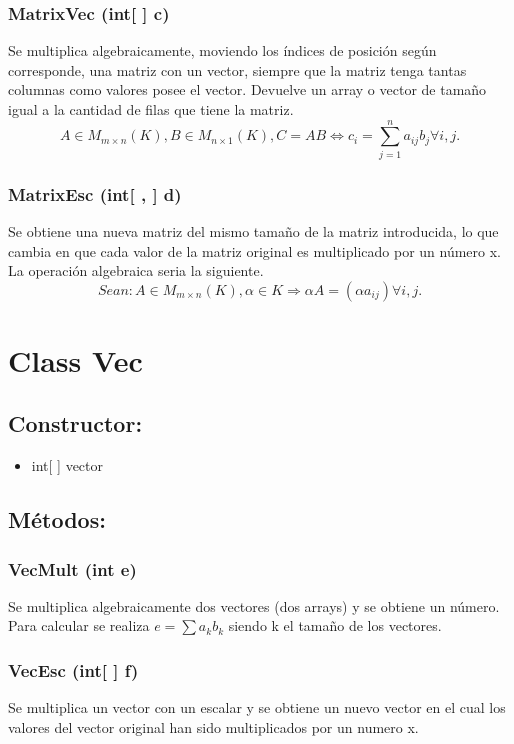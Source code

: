 \documentclass[a4paper,12pt,]{article}
\begin{document}
\subsubsection*{MatrixVec (int[ ] c)}
Se multiplica algebraicamente, moviendo los índices de posición según corresponde, una matriz con un vector, siempre 
que la matriz tenga tantas columnas como valores posee el vector. Devuelve un array o vector de tamaño igual a la 
cantidad de filas que tiene la matriz.
\[ A \in M_{m\times n}(K), B \in M_{n \times 1}(K), C = AB \Leftrightarrow c_i = \sum_{j = 1}^{n} a_{ij}b_j \forall i,j. \]

\subsubsection*{MatrixEsc (int[ , ] d)}
Se obtiene una nueva matriz del mismo tamaño de la matriz introducida, lo que cambia en que cada valor de la matriz 
original es multiplicado por un número x. La operación algebraica seria la siguiente.
\[ Sean:  A \in M_{m\times n}(K), \alpha \in K  \Rightarrow  \alpha A = ( \alpha a_{ij} ) \forall i,j. \]


\section*{Class Vec}

\subsection*{Constructor:}
\begin{itemize}
    \item int[ ] vector
\end{itemize}

\subsection*{Métodos:}
\subsubsection*{VecMult (int e)}
Se multiplica algebraicamente dos vectores (dos arrays) y se obtiene un número. Para calcular se realiza 
$ e = \sum a_k b_k $ siendo k el tamaño de los vectores.

\subsubsection*{VecEsc (int[ ] f)}
Se multiplica un vector con un escalar y se obtiene un nuevo vector en el cual los valores del vector original han 
sido multiplicados por un numero x.
\end{document}
